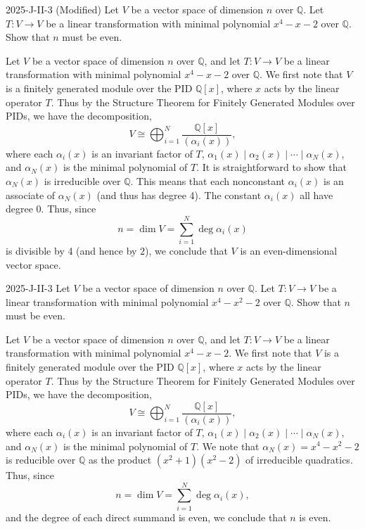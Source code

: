 \documentclass{article}
\begin{document}
	\begin{prb}{2025-J-II-3 (Modified) }
		Let $V$ be a vector space of dimension $n$ over $\mathbb{Q}$. Let $T: V \to V$ be a linear transformation with minimal polynomial $x^{4} - x- 2$ over $\mathbb{Q}$. Show that $n$ must be even. 
	\end{prb}
	Let $V$ be a vector space of dimension $n$ over $\mathbb{Q}$, and let $T: V \to V$ be a linear transformation with minimal polynomial $x^{4} - x - 2$ over $\mathbb{Q}$. We first note that $V$ is a finitely generated module over the PID $\mathbb{Q}[x]$, where $x$ acts by the linear operator $T$. Thus by the Structure Theorem for Finitely Generated Modules over PIDs, we have the decomposition, 
	\begin{equation*}
		V \cong \bigoplus_{i = 1}^{N}\frac{\mathbb{Q}[x]}{(\alpha_{i}(x))}, 
	\end{equation*}
	where each $\alpha_{i}(x)$ is an invariant factor of $T$, $\alpha_{1}(x) \mid \alpha_{2}(x) \mid \dotsm \mid \alpha_{N}(x)$, and $\alpha_{N}(x)$ is the minimal polynomial of $T$. It is straightforward to show that $\alpha_{N}(x)$ is irreducible over $\mathbb{Q}$. This means that each nonconstant $\alpha_{i}(x)$ is an associate of $\alpha_{N}(x)$ (and thus has degree 4). The constant $\alpha_{i}(x)$ all have degree 0. Thus, since 
	\begin{equation*}
		n = \dim{V} = \sum_{i = 1}^{N}\deg{\alpha_{i}(x)}
	\end{equation*}
	is divisible by 4 (and hence by $2$), we conclude that $V$ is an even-dimensional vector space. 
	
	\begin{prb}{2025-J-II-3}
		Let $V$ be a vector space of dimension $n$ over $\mathbb{Q}$. Let $T: V \to V$ be a linear transformation with minimal polynomial $x^{4} - x^{2} - 2$ over $\mathbb{Q}$. Show that $n$ must be even. 
	\end{prb}
	
	Let $V$ be a vector space of dimension $n$ over $\mathbb{Q}$, and let $T: V \to V$ be a linear transformation with minimal polynomial $x^{4} - x - 2$. We first note that $V$ is a finitely generated module over the PID $\mathbb{Q}[x]$, where $x$ acts by the linear operator $T$. Thus by the Structure Theorem for Finitely Generated Modules over PIDs, we have the decomposition, 
	\begin{equation*}
		V \cong \bigoplus_{i = 1}^{N}\frac{\mathbb{Q}[x]}{(\alpha_{i}(x))}, 
	\end{equation*}
	where each $\alpha_{i}(x)$ is an invariant factor of $T$, $\alpha_{1}(x) \mid \alpha_{2}(x) \mid \dotsm \mid \alpha_{N}(x)$, and $\alpha_{N}(x)$ is the minimal polynomial of $T$. We note that $\alpha_{N}(x) = x^{4} - x^{2} - 2$ is reducible over $\mathbb{Q}$ as the product $(x^{2} + 1)(x^{2} - 2)$ of irreducible quadratics. Thus, since 
	\begin{equation*}
		n = \dim{V} = \sum_{i = 1}^{N}\deg{\alpha_{i}(x)}, 
	\end{equation*}
	and the degree of each direct summand is even, we conclude that $n$ is even.
	
\end{document}
